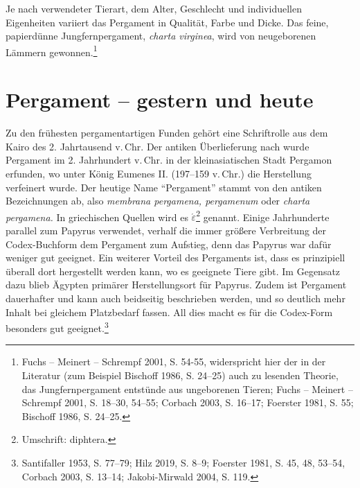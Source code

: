 \documentclass[a4paper,
fontsize=11pt,
oneside,
numbers=noperiodatend,
parskip=half-,
bibliography=totoc,
final
]{scrartcl}
\begin{document}
Je nach verwendeter Tierart, dem Alter, Geschlecht und individuellen
Eigenheiten variiert das Pergament in Qualität, Farbe und Dicke. Das
feine, papierdünne Jungfernpergament, \emph{charta virginea}, wird von
neugeborenen Lämmern gewonnen.\footnote{Fuchs -- Meinert -- Schrempf
  2001, S. 54-55, widerspricht hier der in der Literatur (zum Beispiel
  Bischoff 1986, S. 24--25) auch zu lesenden Theorie, das
  Jungfernpergament entstünde aus ungeborenen Tieren; Fuchs -- Meinert
  -- Schrempf 2001, S. 18--30, 54--55; Corbach 2003, S. 16--17; Foerster
  1981, S. 55; Bischoff 1986, S. 24--25.}

\hypertarget{pergament-gestern-und-heute}{%
\section{Pergament -- gestern und
heute}\label{pergament-gestern-und-heute}}

Zu den frühesten pergamentartigen Funden gehört eine Schriftrolle aus
dem Kairo des 2. Jahrtausend v.\,Chr. Der antiken Überlieferung nach
wurde Pergament im 2. Jahrhundert v.\,Chr. in der kleinasiatischen Stadt
Pergamon erfunden, wo unter König Eumenes II. (197--159 v.\,Chr.) die
Herstellung verfeinert wurde. Der heutige Name \enquote{Pergament}
stammt von den antiken Bezeichnungen ab, also \emph{membrana pergamena,
pergamenum} oder \emph{charta pergamena.} In griechischen Quellen wird
es \textdelta\textiota\textphi\texttau$\acute{\varepsilon}$\textrho\textalpha\footnote{Umschrift: diphtera.} genannt. Einige Jahrhunderte
parallel zum Papyrus verwendet, verhalf die immer größere Verbreitung
der Codex-Buchform dem Pergament zum Aufstieg, denn das Papyrus war
dafür weniger gut geeignet. Ein weiterer Vorteil des Pergaments ist,
dass es prinzipiell überall dort hergestellt werden kann, wo es
geeignete Tiere gibt. Im Gegensatz dazu blieb Ägypten primärer
Herstellungsort für Papyrus. Zudem ist Pergament dauerhafter und kann
auch beidseitig beschrieben werden, und so deutlich mehr Inhalt bei
gleichem Platzbedarf fassen. All dies macht es für die Codex-Form
besonders gut geeignet.\footnote{Santifaller 1953, S. 77--79; Hilz 2019,
  S. 8--9; Foerster 1981, S. 45, 48, 53--54, Corbach 2003, S. 13--14;
  Jakobi-Mirwald 2004, S. 119.}
\end{document}
